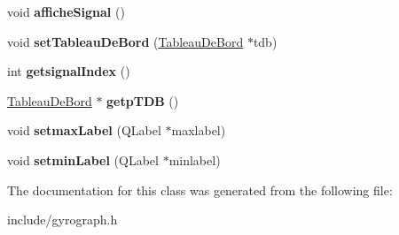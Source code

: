 \begin{DoxyCompactItemize}
\item 
\hypertarget{classgyrograph_a892b6787c49bb542deddfd4df84b5073}{void {\bfseries affiche\-Signal} ()}\label{classgyrograph_a892b6787c49bb542deddfd4df84b5073}

\item 
\hypertarget{classgyrograph_ab27bf84236693162239a99cf7a6ce926}{void {\bfseries set\-Tableau\-De\-Bord} (\hyperlink{class_tableau_de_bord}{Tableau\-De\-Bord} $\ast$tdb)}\label{classgyrograph_ab27bf84236693162239a99cf7a6ce926}

\item 
\hypertarget{classgyrograph_aae6da5eea39c2acde55d7a81a58be29a}{int {\bfseries getsignal\-Index} ()}\label{classgyrograph_aae6da5eea39c2acde55d7a81a58be29a}

\item 
\hypertarget{classgyrograph_ab2c9d1a886a6c7b1b94a550738b59e61}{\hyperlink{class_tableau_de_bord}{Tableau\-De\-Bord} $\ast$ {\bfseries getp\-T\-D\-B} ()}\label{classgyrograph_ab2c9d1a886a6c7b1b94a550738b59e61}

\item 
\hypertarget{classgyrograph_acc3bcb84dab148b361382dbafd617a35}{void {\bfseries setmax\-Label} (Q\-Label $\ast$maxlabel)}\label{classgyrograph_acc3bcb84dab148b361382dbafd617a35}

\item 
\hypertarget{classgyrograph_a20add85c4cc973eba849c64056477eb4}{void {\bfseries setmin\-Label} (Q\-Label $\ast$minlabel)}\label{classgyrograph_a20add85c4cc973eba849c64056477eb4}

\end{DoxyCompactItemize}


The documentation for this class was generated from the following file\-:\begin{DoxyCompactItemize}
\item 
include/gyrograph.\-h\end{DoxyCompactItemize}
